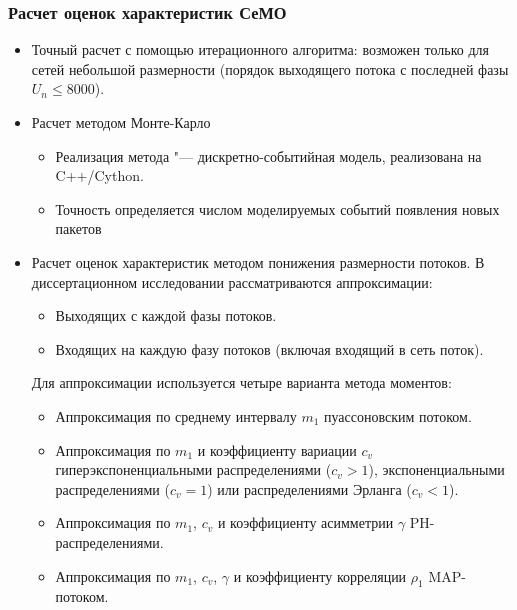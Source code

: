 \begin{frame}
    \frametitle{Расчет оценок характеристик СеМО}
    \footnotesize
    \begin{itemize}
        \item Точный расчет с помощью итерационного алгоритма: возможен только для сетей небольшой размерности (порядок выходящего потока с последней фазы $U_n \leqslant 8000$).
        \item {Расчет методом Монте-Карло
        \footnotesize
        \begin{itemize}
            \item \footnotesize Реализация метода "--- дискретно-событийная модель, реализована на C++/Cython.
            \item Точность определяется числом моделируемых событий появления новых пакетов
        \end{itemize}}
        \item {Расчет оценок характеристик методом понижения размерности потоков. В диссертационном исследовании рассматриваются аппроксимации:
        \footnotesize
        \begin{itemize}
            \item \footnotesize Выходящих с каждой фазы потоков.
            \item Входящих на каждую фазу потоков (включая входящий в сеть поток).
        \end{itemize}
        Для аппроксимации используется четыре варианта метода моментов:
        \begin{itemize}
            \item \footnotesize Аппроксимация по среднему интервалу $m_1$ пуассоновским потоком.
            \item Аппроксимация по $m_1$ и коэффициенту вариации $c_v$ гиперэкспоненциальными распределениями ($c_v > 1$), экспоненциальными распределениями ($c_v = 1$) или распределениями Эрланга ($c_v < 1$).
            \item Аппроксимация по $m_1$, $c_v$ и коэффициенту асимметрии $\gamma$ PH-распределениями.
            \item Аппроксимация по $m_1$, $c_v$, $\gamma$ и коэффициенту корреляции $\rho_1$ MAP-потоком.
        \end{itemize}}
    \end{itemize}
\end{frame}

